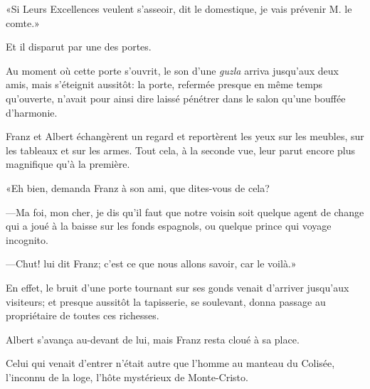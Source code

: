 «Si Leurs Excellences veulent s'asseoir, dit le domestique, je vais prévenir M. le comte.» 

Et il disparut par une des portes. 

Au moment où cette porte s'ouvrit, le son d'une \textit{guzla} arriva jusqu'aux deux amis, mais s'éteignit aussitôt: la porte, refermée presque en même temps qu'ouverte, n'avait pour ainsi dire laissé pénétrer dans le salon qu'une bouffée d'harmonie. 

Franz et Albert échangèrent un regard et reportèrent les yeux sur les meubles, sur les tableaux et sur les armes. Tout cela, à la seconde vue, leur parut encore plus magnifique qu'à la première. 

«Eh bien, demanda Franz à son ami, que dites-vous de cela? 

—Ma foi, mon cher, je dis qu'il faut que notre voisin soit quelque agent de change qui a joué à la baisse sur les fonds espagnols, ou quelque prince qui voyage incognito.  

—Chut! lui dit Franz; c'est ce que nous allons savoir, car le voilà.» 

En effet, le bruit d'une porte tournant sur ses gonds venait d'arriver jusqu'aux visiteurs; et presque aussitôt la tapisserie, se soulevant, donna passage au propriétaire de toutes ces richesses. 

Albert s'avança au-devant de lui, mais Franz resta cloué à sa place. 

Celui qui venait d'entrer n'était autre que l'homme au manteau du Colisée, l'inconnu de la loge, l'hôte mystérieux de Monte-Cristo. 